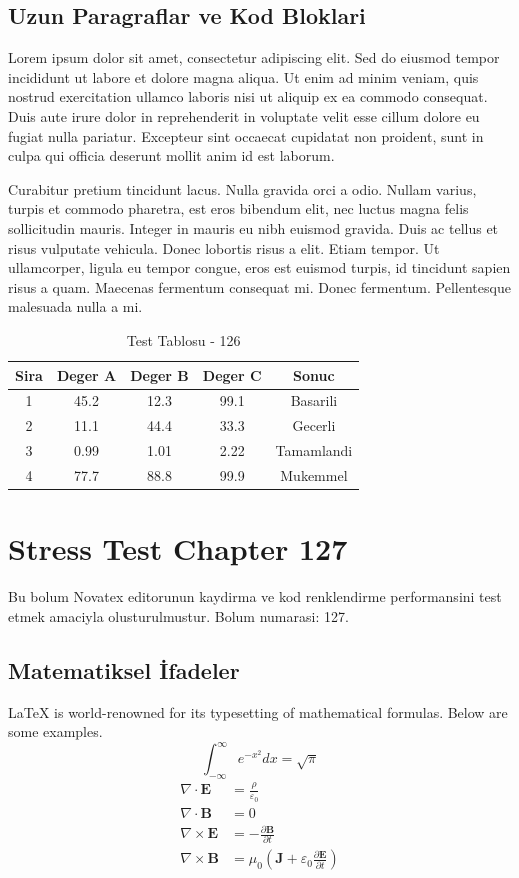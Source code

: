 \documentclass[12pt,a4paper]{article}
\begin{document}
\subsection{Uzun Paragraflar ve Kod Bloklari}
Lorem ipsum dolor sit amet, consectetur adipiscing elit. Sed do eiusmod tempor incididunt ut labore et dolore magna aliqua. Ut enim ad minim veniam, quis nostrud exercitation ullamco laboris nisi ut aliquip ex ea commodo consequat. Duis aute irure dolor in reprehenderit in voluptate velit esse cillum dolore eu fugiat nulla pariatur. Excepteur sint occaecat cupidatat non proident, sunt in culpa qui officia deserunt mollit anim id est laborum.

Curabitur pretium tincidunt lacus. Nulla gravida orci a odio. Nullam varius, turpis et commodo pharetra, est eros bibendum elit, nec luctus magna felis sollicitudin mauris. Integer in mauris eu nibh euismod gravida. Duis ac tellus et risus vulputate vehicula. Donec lobortis risus a elit. Etiam tempor. Ut ullamcorper, ligula eu tempor congue, eros est euismod turpis, id tincidunt sapien risus a quam. Maecenas fermentum consequat mi. Donec fermentum. Pellentesque malesuada nulla a mi.

\begin{table}[h!]
\centering
\begin{tabular}{|c|c|c|c|c|}
\hline
\textbf{Sira} & \textbf{Deger A} & \textbf{Deger B} & \textbf{Deger C} & \textbf{Sonuc} \\
\hline
1 & 45.2 & 12.3 & 99.1 & Basarili \\
2 & 11.1 & 44.4 & 33.3 & Gecerli \\
3 & 0.99 & 1.01 & 2.22 & Tamamlandi \\
4 & 77.7 & 88.8 & 99.9 & Mukemmel \\
\hline
\end{tabular}
\caption{Test Tablosu - 126}
\end{table}

\newpage
\section{Stress Test Chapter 127}
Bu bolum Novatex editorunun kaydirma ve kod renklendirme performansini test etmek amaciyla olusturulmustur. Bolum numarasi: 127.

\subsection{Matematiksel İfadeler}
\LaTeX{} is world-renowned for its typesetting of mathematical formulas. Below are some examples.
\begin{equation}
\int_{-\infty}^{\infty} e^{-x^2} dx = \sqrt{\pi}
\end{equation}
\begin{align}
\nabla \cdot \mathbf{E} &= \frac{\rho}{\varepsilon_0} \\
\nabla \cdot \mathbf{B} &= 0 \\
\nabla \times \mathbf{E} &= -\frac{\partial \mathbf{B}}{\partial t} \\
\nabla \times \mathbf{B} &= \mu_0\left(\mathbf{J} + \varepsilon_0 \frac{\partial \mathbf{E}}{\partial t}\right)
\end{align}
\end{document}
